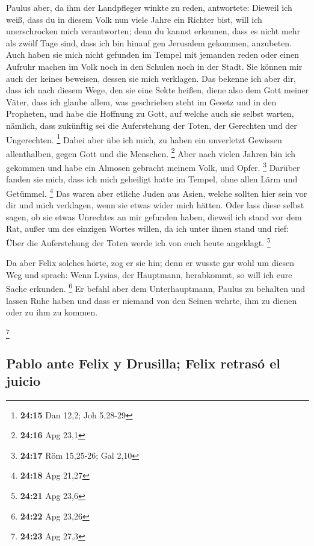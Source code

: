  Paulus aber, da ihm der Landpfleger winkte zu reden,
antwortete: Dieweil ich weiß, dass du in diesem Volk nun viele Jahre ein
Richter bist, will ich unerschrocken mich verantworten; 
denn du kannst erkennen, dass es nicht mehr als zwölf Tage sind, dass
ich bin hinauf gen Jerusalem gekommen, anzubeten.  Auch
haben sie mich nicht gefunden im Tempel mit jemanden reden oder einen
Aufruhr machen im Volk noch in den Schulen noch in der Stadt.
 Sie können mir auch der keines beweisen, dessen sie mich
verklagen.  Das bekenne ich aber dir, dass ich nach
diesem Wege, den sie eine Sekte heißen, diene also dem Gott meiner
Väter, dass ich glaube allem, was geschrieben steht im Gesetz und in den
Propheten,  und habe die Hoffnung zu Gott, auf welche
auch sie selbst warten, nämlich, dass zukünftig sei die Auferstehung der
Toten, der Gerechten und der Ungerechten. \footnote{\textbf{24:15} Dan
  12,2; Joh 5,28-29}  Dabei aber übe ich mich, zu haben
ein unverletzt Gewissen allenthalben, gegen Gott und die Menschen.
\footnote{\textbf{24:16} Apg 23,1}  Aber nach vielen
Jahren bin ich gekommen und habe ein Almosen gebracht meinem Volk, und
Opfer. \footnote{\textbf{24:17} Röm 15,25-26; Gal 2,10} 
Darüber fanden sie mich, dass ich mich geheiligt hatte im Tempel, ohne
allen Lärm und Getümmel. \footnote{\textbf{24:18} Apg 21,27}
 Das waren aber etliche Juden aus Asien, welche sollten
hier sein vor dir und mich verklagen, wenn sie etwas wider mich hätten.
 Oder lass diese selbst sagen, ob sie etwas Unrechtes an
mir gefunden haben, dieweil ich stand vor dem Rat,  außer
um des einzigen Wortes willen, da ich unter ihnen stand und rief: Über
die Auferstehung der Toten werde ich von euch heute angeklagt.
\footnote{\textbf{24:21} Apg 23,6}

 Da aber Felix solches hörte, zog er sie hin; denn er
wusste gar wohl um diesen Weg und sprach: Wenn Lysias, der Hauptmann,
herabkommt, so will ich eure Sache erkunden. \footnote{\textbf{24:22}
  Apg 23,26}  Er befahl aber dem Unterhauptmann, Paulus
zu behalten und lassen Ruhe haben und dass er niemand von den Seinen
wehrte, ihm zu dienen oder zu ihm zu kommen.

\footnote{\textbf{24:23} Apg 27,3}

\hypertarget{pablo-ante-felix-y-drusilla-felix-retrasuxf3-el-juicio}{%
\subsection{Pablo ante Felix y Drusilla; Felix retrasó el
juicio}\label{pablo-ante-felix-y-drusilla-felix-retrasuxf3-el-juicio}}


